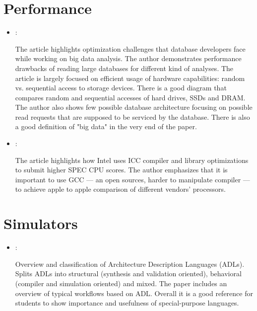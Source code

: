 \section*{Performance}
\begin{itemize}
    \item \cite{Jacobs:DataBasePerformance:2009}:

    The article highlights optimization challenges that database developers face while working on big data analysis. The author demonstrates performance drawbacks of reading large databases for different kind of analyses. The article is largely focused on efficient usage of hardware capabilities: random vs. sequential access to storage devices. There is a good diagram that compares random and sequential accesses of hard drives, SSDs and DRAM. The author also shows few possible database architecture focusing on possible read requests that are supposed to be serviced by the database. There is also a good definition of "big data" in the very end of the paper.

    \item \cite{Gwennap:IntelHidesBehindICC:2017}:

    The article highlights how Intel uses ICC compiler and library optimizations to submit higher SPEC CPU scores. The author emphasizes that it is important to use GCC --- an open sources, harder to manipulate compiler --- to achieve apple to apple comparison of different vendors' processors.
\end{itemize}

\section*{Simulators}
\begin{itemize}
    \item \cite{Mishra:ADL:2005}:

    Overview and classification of Architecture Description Languages (ADLs). Splits ADLs into structural (synthesis and validation oriented), behavioral (compiler and simulation oriented) and mixed. The paper includes an overview of typical workflows based on ADL. Overall it is a good reference for students to show importance and usefulness of special-purpose languages.
\end{itemize}


